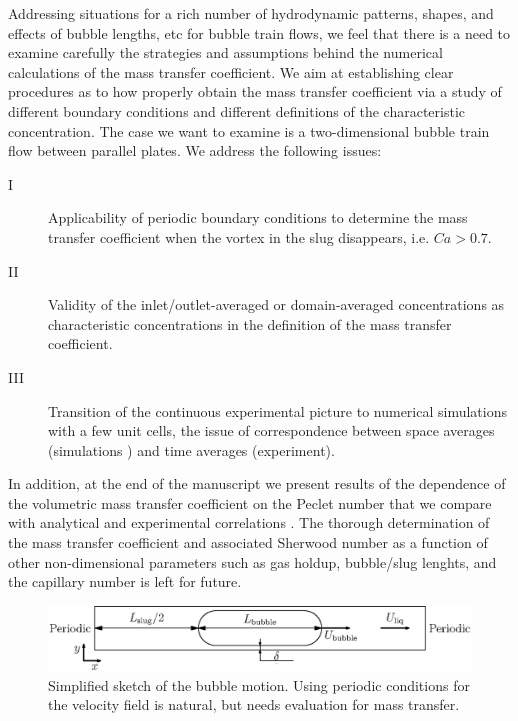 \documentclass{article}
\begin{document}
Addressing situations for a rich number of hydrodynamic patterns, shapes, and
effects of bubble lengths, etc for bubble train flows, we feel that there is a need to examine 
carefully the strategies and assumptions behind the numerical calculations
of the mass transfer coefficient. We aim at establishing clear
procedures as to how properly obtain the mass transfer coefficient via a study
of different boundary conditions and different definitions of the characteristic concentration.
The case we want to examine is a two-dimensional bubble train flow between parallel plates.
We address the following issues:
 \begin{description}
 \item[I] Applicability of periodic boundary
conditions to determine the mass transfer coefficient when the vortex in the slug
disappears, i.e. $Ca>0.7$.
 \item[II] Validity of the inlet/outlet-averaged or domain-averaged concentrations as
characteristic concentrations in the definition of the mass transfer
coefficient.
 \item[III] Transition of the continuous experimental picture to
numerical simulations with a few unit cells, the issue of correspondence
between space averages (simulations \cite{vanbaten-circular}) and time averages (experiment).
\end{description}
In addition, at the end of the manuscript we present results of the dependence of the volumetric
mass transfer coefficient on the Peclet number that we compare with analytical \cite{irandoust} and experimental correlations
\cite{yue-mass}.  The thorough determination of the mass transfer coefficient and associated Sherwood number as a
function of other non-dimensional parameters such as gas holdup, bubble/slug
lenghts, and the capillary number is left for future.
\begin{figure}[htb!]
\includegraphics[width=\textwidth]{Figures/benchmark_hydro.eps}
\caption{Simplified sketch of the bubble motion. Using periodic
conditions for the velocity field is natural, but needs evaluation for mass
transfer.
\label{fig:benchmark:hydro}}
\end{figure}
\end{document}
